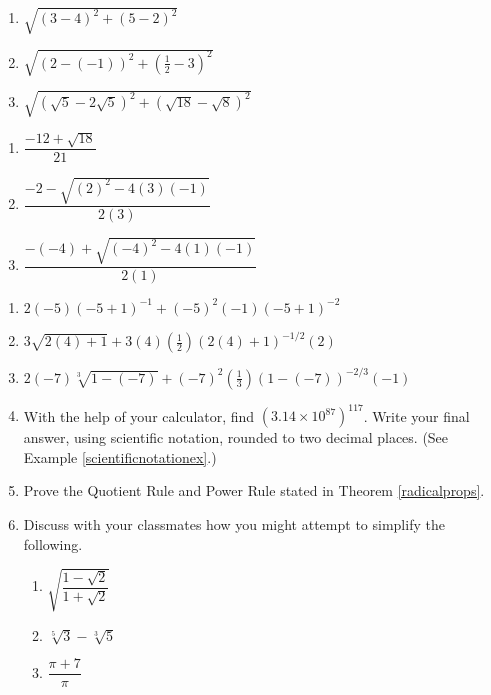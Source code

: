 \documentclass{ximera}
\begin{document}
\begin{multicols}{3}
\begin{enumerate}
\setcounter{enumi}{\value{HW}}

\item  $\sqrt{(3-4)^2 + (5-2)^2}$
\item  $\sqrt{(2 - (-1))^2 + \left(\frac{1}{2} - 3\right)^2}$ 
\item  $\sqrt{(\sqrt{5} - 2\sqrt{5})^2 + (\sqrt{18} - \sqrt{8})^2}$

\setcounter{HW}{\value{enumi}}
\end{enumerate}
\end{multicols}

\begin{multicols}{3}
\begin{enumerate}
\setcounter{enumi}{\value{HW}}

\item  $\dfrac{-12 + \sqrt{18}}{21}$
\item  $\dfrac{-2 - \sqrt{(2)^2 - 4(3)(-1)}}{2(3)}$  
\item  $\dfrac{-(-4) + \sqrt{(-4)^2 - 4(1)(-1)}}{2(1)}$

\setcounter{HW}{\value{enumi}}
\end{enumerate}
\end{multicols}

\begin{enumerate}
\setcounter{enumi}{\value{HW}}

\item $2(-5)(-5+1)^{-1} + (-5)^2(-1)(-5+1)^{-2}$
\item $3\sqrt{2(4)+1} + 3(4)\left(\frac{1}{2}\right)(2(4)+1)^{-1/2}(2)$
\item $2(-7)\sqrt[3]{1-(-7)} + (-7)^2 \left(\frac{1}{3}\right)(1-(-7))^{-2/3}(-1)$ \label{arithexlast}

\item With the help of your calculator, find $(3.14 \times 10^{87})^{117}$.  Write your final answer, using scientific notation, rounded to two decimal places. (See Example \ref{scientificnotationex}.)

\item Prove the Quotient Rule and Power Rule stated in Theorem \ref{radicalprops}.

\item Discuss with your classmates how you might attempt to simplify the following.

\begin{enumerate}

\item $\sqrt{\dfrac{1 - \sqrt{2}}{1 + \sqrt{2}}}$

\item $\sqrt[5]{3} - \sqrt[3]{5}$

\item $\dfrac{\pi + 7}{\pi}$

\end{enumerate}

\end{enumerate}
\end{document}
